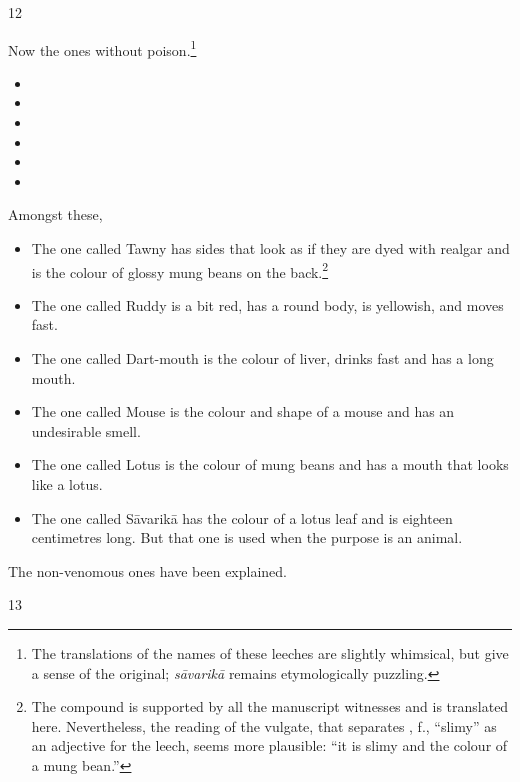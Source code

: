 \begin{translation}
\item[12]

Now the ones without poison.\footnote{The translations of the names of these 
leeches are slightly whimsical, but give a sense of the original; \emph{sāvarikā} 
remains etymologically puzzling.} 
\begin{itemize}
    \item {}
    \item {}
    \item {}
    \item {}
    \item {}
    \item {}
\end{itemize}
Amongst these,
\begin{itemize}
    \item The one called Tawny has sides that look as if they are dyed with
realgar and is the colour of glossy mung beans on the back.\footnote{The
    compound  is supported by all the manuscript
    witnesses and is translated here.  Nevertheless, the reading of the
    vulgate, that separates , f., “slimy” as an adjective for the
    leech, seems more plausible: “it is slimy and the colour of a mung
    bean.”}
    
    \item The one called Ruddy is a bit red, has a round body, is yellowish, and 
    moves fast.
    
    \item The one called Dart-mouth is the colour of liver, drinks fast and has a long 
    mouth.
    
    \item The one called Mouse is the colour and shape of a mouse and has an 
    undesirable smell.
    
    \item The one called Lotus is the colour of mung beans and has a mouth that looks 
    like a lotus.
    
    \item The one called Sāvarikā has the colour of a lotus leaf and is eighteen 
    centimetres long.  But that one is used when the purpose is an animal. 
\end{itemize}
The non-venomous ones have been explained.

\item [13]


\end{translation}
